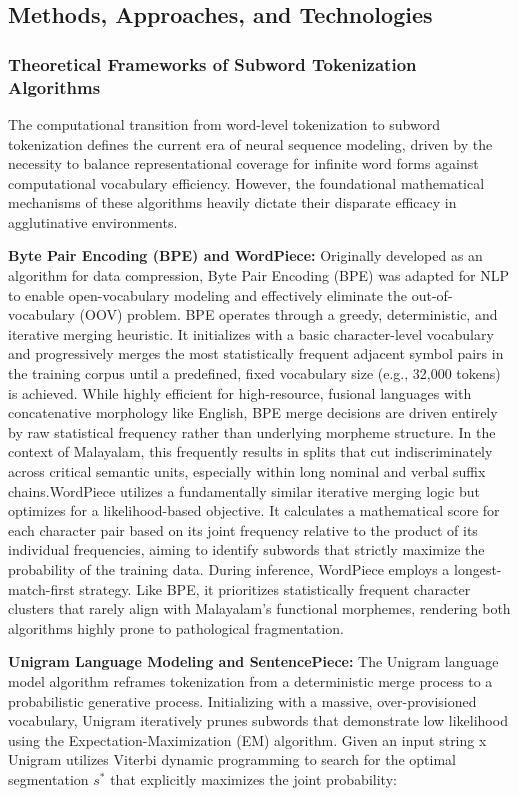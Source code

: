 \documentclass[12pt]{article}
\begin{document}
\subsection{Methods, Approaches, and Technologies }
\subsubsection{Theoretical Frameworks of Subword Tokenization Algorithms }

The computational transition from word-level tokenization to subword tokenization defines the current era of neural sequence modeling, driven by the necessity to balance representational coverage for infinite word forms against computational vocabulary efficiency. However, the foundational mathematical mechanisms of these algorithms heavily dictate their disparate efficacy in agglutinative environments. 

\textbf{Byte Pair Encoding (BPE) and WordPiece:}\cite{sennrich2016neural} Originally developed as an algorithm for data compression, Byte Pair Encoding (BPE) was adapted for NLP to enable open-vocabulary modeling and effectively eliminate the out-of-vocabulary (OOV) problem. BPE operates through a greedy, deterministic, and iterative merging heuristic. It initializes with a basic character-level vocabulary and progressively merges the most statistically frequent adjacent symbol pairs in the training corpus until a predefined, fixed vocabulary size (e.g., 32,000 tokens) is achieved. While highly efficient for high-resource, fusional languages with concatenative morphology like English, BPE merge decisions are driven entirely by raw statistical frequency rather than underlying morpheme structure. In the context of Malayalam, this frequently results in splits that cut indiscriminately across critical semantic units, especially within long nominal and verbal suffix chains.WordPiece utilizes a fundamentally similar iterative merging logic but optimizes for a likelihood-based objective. It calculates a mathematical score for each character pair based on its joint frequency relative to the product of its individual frequencies, aiming to identify subwords that strictly maximize the probability of the training data. During inference, WordPiece employs a longest-match-first strategy. Like BPE, it prioritizes statistically frequent character clusters that rarely align with Malayalam's functional morphemes, rendering both algorithms highly prone to pathological fragmentation. 

\textbf{Unigram Language Modeling and SentencePiece:}\cite{kudo2018sentencepiece} The Unigram language model algorithm reframes tokenization from a deterministic merge process to a probabilistic generative process. Initializing with a massive, over-provisioned vocabulary, Unigram iteratively prunes subwords that demonstrate low likelihood using the Expectation-Maximization (EM) algorithm. Given an input string x Unigram utilizes Viterbi dynamic programming to search for the optimal segmentation $s^*$ that explicitly maximizes the joint probability:
\end{document}
